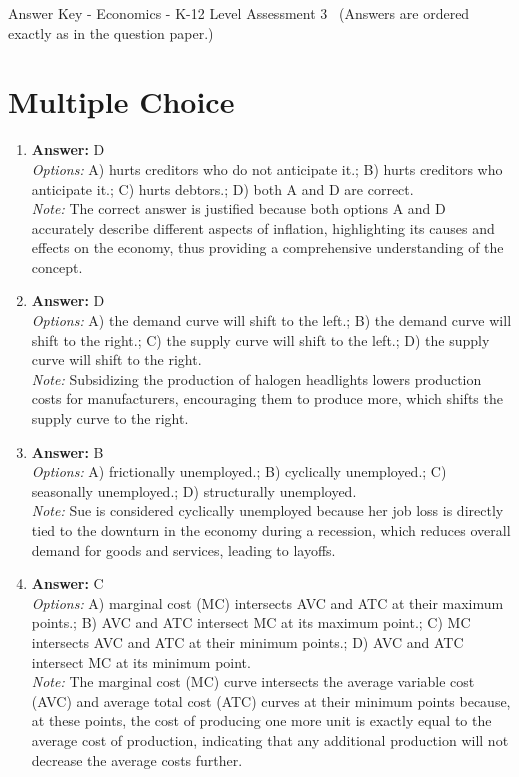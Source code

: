 \documentclass[12pt]{article}
\begin{document}
\begin{center}
Answer Key - Economics - K-12 Level Assessment 3 \
\small (Answers are ordered exactly as in the question paper.)
\end{center}

\section*{Multiple Choice}
\begin{enumerate}[label=\arabic*.]
\item \textbf{Answer:} D
\\ \textit{Options:} A) hurts creditors who do not anticipate it.; B) hurts creditors who anticipate it.; C) hurts debtors.; D) both A and D are correct.
\\ \textit{Note:} The correct answer is justified because both options A and D accurately describe different aspects of inflation, highlighting its causes and effects on the economy, thus providing a comprehensive understanding of the concept.
\item \textbf{Answer:} D
\\ \textit{Options:} A) the demand curve will shift to the left.; B) the demand curve will shift to the right.; C) the supply curve will shift to the left.; D) the supply curve will shift to the right.
\\ \textit{Note:} Subsidizing the production of halogen headlights lowers production costs for manufacturers, encouraging them to produce more, which shifts the supply curve to the right.
\item \textbf{Answer:} B
\\ \textit{Options:} A) frictionally unemployed.; B) cyclically unemployed.; C) seasonally unemployed.; D) structurally unemployed.
\\ \textit{Note:} Sue is considered cyclically unemployed because her job loss is directly tied to the downturn in the economy during a recession, which reduces overall demand for goods and services, leading to layoffs.
\item \textbf{Answer:} C
\\ \textit{Options:} A) marginal cost (MC) intersects AVC and ATC at their maximum points.; B) AVC and ATC intersect MC at its maximum point.; C) MC intersects AVC and ATC at their minimum points.; D) AVC and ATC intersect MC at its minimum point.
\\ \textit{Note:} The marginal cost (MC) curve intersects the average variable cost (AVC) and average total cost (ATC) curves at their minimum points because, at these points, the cost of producing one more unit is exactly equal to the average cost of production, indicating that any additional production will not decrease the average costs further.

\end{enumerate}
\end{document}
